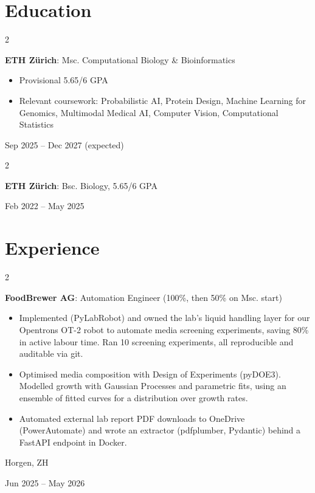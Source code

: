 \documentclass[10pt, letterpaper]{article}
\newenvironment{highlights}{
    \begin{itemize}[
        topsep=0.10 cm,
        parsep=0.10 cm,
        partopsep=0pt,
        itemsep=0pt,
        leftmargin=0.4 cm + 10pt
    ]
}{
    \end{itemize}
} %
\newenvironment{twocolentry}[2][]{
    \onecolentry
    \def\secondColumn{#2}
    \setcolumnwidth{\fill, 4.5 cm}
    \begin{paracol}{2}
}{
    \switchcolumn \raggedleft \secondColumn
    \end{paracol}
    \endonecolentry
} %
\begin{document}
    \section{Education}
    \begin{twocolentry}{
             \hspace{1cm} Sep 2025 -- Dec 2027 \newline (expected)
        }
            \textbf{ETH Zürich}: Msc. Computational Biology \& Bioinformatics
            \begin{highlights}
            \item Provisional 5.65/6 GPA
            \item Relevant coursework: Probabilistic AI, Protein Design, Machine Learning for \mbox{Genomics}, Multimodal Medical AI, Computer Vision, Computational Statistics
                \end{highlights}
        \end{twocolentry}
      \begin{twocolentry}{
             \hspace{1cm} Feb 2022 -- May 2025
        }
            \textbf{ETH Zürich}: Bsc. Biology, 5.65/6 GPA
        \end{twocolentry}


\section{Experience}
 \begin{twocolentry}{
            Horgen, ZH

        Jun 2025 -- May 2026
        }
            \textbf{FoodBrewer AG}: Automation Engineer (100\%, then 50\% on Msc. start)
               
            \begin{highlights}
            \item Implemented (PyLabRobot) and owned the lab's liquid handling layer for our Opentrons OT-2 robot to automate media screening experiments, saving 80\% in active labour time. Ran 10 screening experiments, all reproducible and auditable via git.
          \item Optimised media composition with Design of Experiments (pyDOE3). Modelled growth with Gaussian Processes and parametric fits, using an ensemble of fitted curves for a distribution over growth rates.
            \item Automated external lab report PDF downloads to OneDrive (PowerAutomate) and wrote an extractor (pdfplumber, Pydantic) behind a FastAPI endpoint in Docker.
          
                    
            \end{highlights}
        \end{twocolentry}
\end{document}
